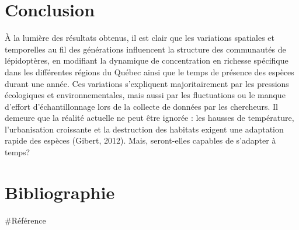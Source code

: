 \documentclass[9pt,twocolumn,twoside,]{pnas-new}
\begin{document}
\section*{Conclusion}\label{conclusion}

À la lumière des résultats obtenus, il est clair que les variations
spatiales et temporelles au fil des générations influencent la structure
des communautés de lépidoptères, en modifiant la dynamique de
concentration en richesse spécifique dans les différentes régions du
Québec ainsi que le temps de présence des espèces durant une année. Ces
variations s'expliquent majoritairement par les pressions écologiques et
environnementales, mais aussi par les fluctuations ou le manque d'effort
d'échantillonnage lors de la collecte de données par les chercheurs. Il
demeure que la réalité actuelle ne peut être ignorée : les hausses de
température, l'urbanisation croissante et la destruction des habitats
exigent une adaptation rapide des espèces (Gibert, 2012). Mais,
seront-elles capables de s'adapter à temps?

\section*{Bibliographie}\label{bibliographie}

\#Référence
\end{document}
